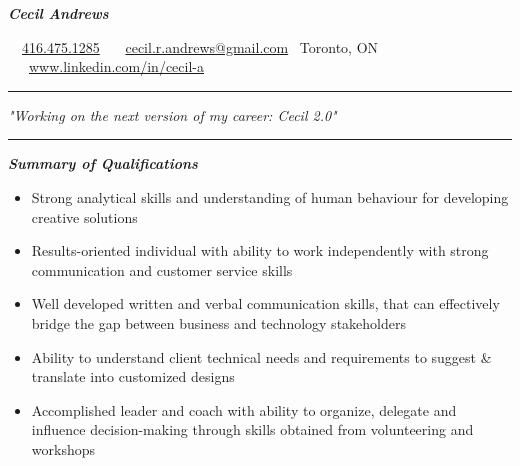 \documentclass{article}
\begin{document}
\begin{center}
   
\Huge \textcolor{ablue}{\textit{\textbf{Cecil Andrews}}}

\end{center}

\begin{center}
 
\faPhone \ \   \href{  tel:+1 416.475.1285}{416.475.1285} \textbar  \ \faEnvelope \  \  \href{mailto:cecil.r.andrews@gmail.com}{cecil.r.andrews@gmail.com}  \textbar  \ Toronto, ON   \textbar  \  \faLinkedin \  \ \href{http://www.linkedin.com/in/cecil-a}{www.linkedin.com/in/cecil-a}

\end{center}


\noindent
{\color{ablue} \rule{\linewidth}{0.5mm} }
\begin{center}
\setmainfont{Times New Roman}
\textcolor{ablue}{\LARGE \textit{"Working on the next version of my career: Cecil 2.0"}}
\end{center}
\textnormal
\noindent
{\color{ablue} \rule{\linewidth}{0.5mm} }

\begin{center}
\large \textcolor{ablue}{\textit{\textbf{Summary of Qualifications}}}
\end{center}

\begin{flushleft}
\begin{itemize}
\item Strong analytical skills and understanding of human behaviour for developing creative solutions\\
\item Results-oriented individual with ability to work independently with strong communication and customer service skills \\
\item Well developed written and verbal communication skills, that can effectively bridge the gap between business and technology stakeholders \\
\item Ability to understand client technical needs and requirements to suggest \& translate into customized designs\\
\item Accomplished leader and  coach with ability to organize, delegate and influence decision-making through skills obtained from volunteering and workshops
\end{itemize}
\end{flushleft}
\end{document}
